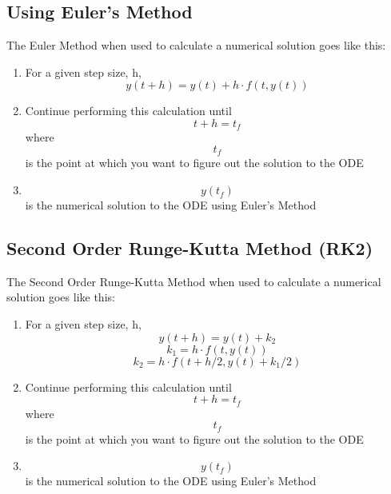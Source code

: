 \documentclass[12pt]{article}
\begin{document}
\subsection{Using Euler's Method}\label{sec::using}
The Euler Method when used to calculate a numerical solution goes like this:
\begin{enumerate}
\item For a given step size, h, \begin{equation}
y(t+h) = y(t) + h \cdot f(t,y(t))
\end{equation}
\item Continue performing this calculation until \begin{equation}
t+h = t_f
\end{equation} where \begin{equation}
t_f
\end{equation} is the point at which you want to figure out the solution to the ODE 
\item \begin{equation}
y(t_f)
\end{equation} is the numerical solution to the ODE using Euler's Method

\end{enumerate}


\subsection{Second Order Runge-Kutta Method (RK2)}\label{sec::table}
The Second Order Runge-Kutta Method when used to calculate a numerical solution goes like this:
\begin{enumerate}
\item For a given step size, h, \begin{equation}
y(t+h) = y(t) + k_2
\end{equation}
\begin{equation}
k_1 = h \cdot f(t,y(t))
\end{equation}
\begin{equation}
k_2 = h \cdot f(t + h/2, y(t) + k_1/2)
\end{equation}
\item Continue performing this calculation until \begin{equation}
t+h = t_f
\end{equation} where \begin{equation}
t_f
\end{equation} is the point at which you want to figure out the solution to the ODE 
\item \begin{equation}
y(t_f)
\end{equation} is the numerical solution to the ODE using Euler's Method

\end{enumerate}
\end{document}

